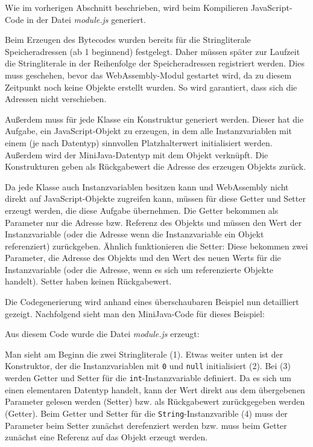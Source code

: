 Wie im vorherigen Abschnitt beschrieben, wird beim Kompilieren JavaScript-Code in der Datei \emph{module.js} generiert.

Beim Erzeugen des Bytecodes wurden bereits für die Stringliterale Speicheradressen (ab 1 beginnend) festgelegt. Daher müssen später zur Laufzeit die Stringliterale in der Reihenfolge der Speicheradressen registriert werden. Dies muss geschehen, bevor das WebAssembly-Modul gestartet wird, da zu diesem Zeitpunkt noch keine Objekte erstellt wurden. So wird garantiert, dass sich die Adressen nicht verschieben.

Außerdem muss für jede Klasse ein Konstruktur generiert werden. Dieser hat die Aufgabe, ein JavaScript-Objekt zu erzeugen, in dem alle Instanzvariablen mit einem (je nach Datentyp) sinnvollen Platzhalterwert initialisiert werden. Außerdem wird der MiniJava-Datentyp mit dem Objekt verknüpft. Die Konstrukturen geben als Rückgabewert die Adresse des erzeugen Objekts zurück.

Da jede Klasse auch Instanzvariablen besitzen kann und WebAssembly nicht direkt auf JavaScript-Objekte zugreifen kann, müssen für diese Getter und Setter erzeugt werden, die diese Aufgabe übernehmen. Die Getter bekommen als Parameter nur die Adresse bzw. Referenz des Objekts und müssen den Wert der Instanzvariable (oder die Adresse wenn die Instanzvariable ein Objekt referenziert) zurückgeben. Ähnlich funktionieren die Setter: Diese bekommen zwei Parameter, die Adresse des Objekts und den Wert des neuen Werts für die Instanzvariable (oder die Adresse, wenn es sich um referenzierte Objekte handelt). Setter haben keinen Rückgabewert.

Die Codegenerierung wird anhand eines überschaubaren Beispiel nun detailliert gezeigt. Nachfolgend sieht man den MiniJava-Code für dieses Beispiel:



Aus diesem Code wurde die Datei \emph{module.js} erzeugt:



Man sieht am Beginn die zwei Stringliterale (1). Etwas weiter unten ist der Konstruktor, der die Instanzvariablen mit \lstinline{0} und \lstinline{null} initialisiert (2). Bei (3) werden Getter und Setter für die \lstinline{int}-Instanzvariable definiert. Da es sich um einen elementaren Datentyp handelt, kann der Wert direkt aus dem übergebenen Parameter gelesen werden (Setter) bzw. als Rückgabewert zurückgegeben werden (Getter). Beim Getter und Setter für die \lstinline{String}-Instanzvarible (4) muss der Parameter beim Setter zunächst derefenziert werden bzw. muss beim Getter zunächst eine Referenz auf das Objekt erzeugt werden.

